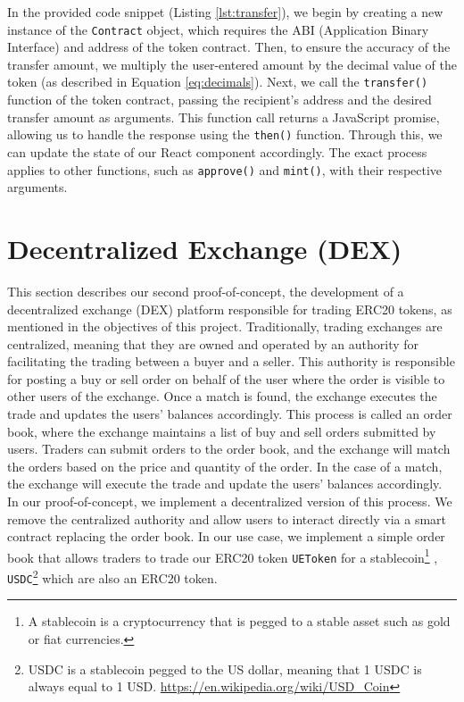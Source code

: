 In the provided code snippet (Listing \ref{lst:transfer}), we begin by creating a new instance of the \texttt{Contract} object, which requires the ABI (Application Binary Interface) and address of the token contract. Then, to ensure the accuracy of the transfer amount, we multiply the user-entered amount by the decimal value of the token (as described in Equation \ref{eq:decimals}).
Next, we call the \texttt{transfer()} function of the token contract, passing the recipient's address and the desired transfer amount as arguments. This function call returns a JavaScript promise, allowing us to handle the response using the \texttt{then()} function. Through this, we can update the state of our React component accordingly. The exact process applies to other functions, such as \texttt{approve()} and \texttt{mint()}, with their respective arguments.




\section{Decentralized Exchange (DEX)}
\label{sec:dex}

This section describes our second proof-of-concept, the development of a decentralized exchange (DEX) platform responsible for trading ERC20 tokens,
as mentioned in the objectives of this project. Traditionally, trading exchanges are centralized, meaning that they are owned and operated by
an authority for facilitating the trading between a buyer and a seller. This authority is responsible for posting a buy or sell order on behalf
of the user where the order is visible to other users of the exchange. Once a match is found, the exchange executes the trade and updates the
users' balances accordingly. This process is called an order book, where the exchange maintains a list of buy and sell orders
submitted by users. Traders can submit orders to the order book, and the exchange will match the orders based on the price and quantity of the
order. In the case of a match, the exchange will execute the trade and update the users' balances accordingly. In our proof-of-concept, we
implement a decentralized version of this process. We remove the centralized authority and allow users to interact directly
via a smart contract replacing the order book. In our use case, we implement a simple order book that allows traders to trade our ERC20 token
\texttt{UEToken} for a stablecoin\footnote{A stablecoin is a cryptocurrency that is pegged to a stable asset such as gold or fiat currencies.}
, \texttt{USDC}\footnote{USDC is a stablecoin pegged to the US dollar, meaning that 1 USDC is always equal to 1 USD. \url{https://en.wikipedia.org/wiki/USD_Coin} }
which are also an ERC20 token.


